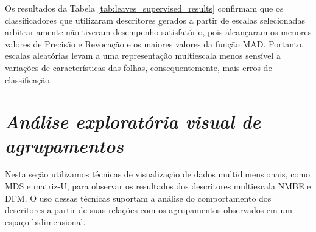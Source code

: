 Os resultados da Tabela \ref{tab:leaves_supervised_results} confirmam que os classificadores que utilizaram descritores gerados a partir de escalas selecionadas arbitrariamente não tiveram desempenho satisfatório, pois alcançaram os menores valores de Precisão e Revocação e os maiores valores da função \ac{MAD}. Portanto, escalas aleatórias levam a uma representação multiescala menos sensível a variações de características das folhas, consequentemente, mais erros de classificação. 

\section{\emph{Análise exploratória visual de agrupamentos}}

Nesta seção utilizamos técnicas de visualização de dados multidimensionais, como \ac{MDS} e matriz-U, para observar os resultados dos descritores multiescala \ac{NMBE} e \ac{DFM}. O uso dessas técnicas suportam a análise do comportamento dos descritores a partir de suas relações com os agrupamentos observados em um espaço bidimensional. 



